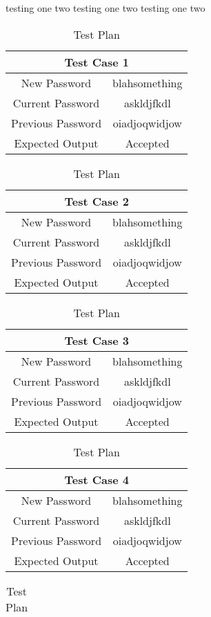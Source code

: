 \documentclass[12pt,letterpaper]{article}
\begin{document}
testing one two
testing one two
testing one two

\begin{table}[h]
  \caption{Test Plan}
  \label{tab:Test Plan}
\begin{centering}
  \begin{tabular}{||c|c||}
  \hline
  \multicolumn{2}{||c||}{Test Case 1} \\
  \hline
  New Password & blahsomething \\
  \hline
  Current Password & askldjfkdl \\
  \hline
  Previous Password & oiadjoqwidjow \\
  \hline
  Expected Output & Accepted \\
  \hline
  \end{tabular}
  \begin{tabular}{||c|c||}
  \hline
  \multicolumn{2}{||c||}{Test Case 2} \\
  \hline
  New Password & blahsomething \\
  \hline
  Current Password & askldjfkdl \\
  \hline
  Previous Password & oiadjoqwidjow \\
  \hline
  Expected Output & Accepted \\
  \hline
  \end{tabular}
  \begin{tabular}{||c|c||}
  \hline
  \multicolumn{2}{||c||}{Test Case 3} \\
  \hline
  New Password & blahsomething \\
  \hline
  Current Password & askldjfkdl \\
  \hline
  Previous Password & oiadjoqwidjow \\
  \hline
  Expected Output & Accepted \\
  \hline
  \end{tabular}
  \begin{tabular}{||c|c||}
  \hline
  \multicolumn{2}{||c||}{Test Case 4} \\
  \hline
  New Password & blahsomething \\
  \hline
  Current Password & askldjfkdl \\
  \hline
  Previous Password & oiadjoqwidjow \\
  \hline
  Expected Output & Accepted \\
  \hline
  \end{tabular}
  \begin{tabular}{||c|c||}

\end{tabular}
\end{centering}
\end{table}
\end{document}
